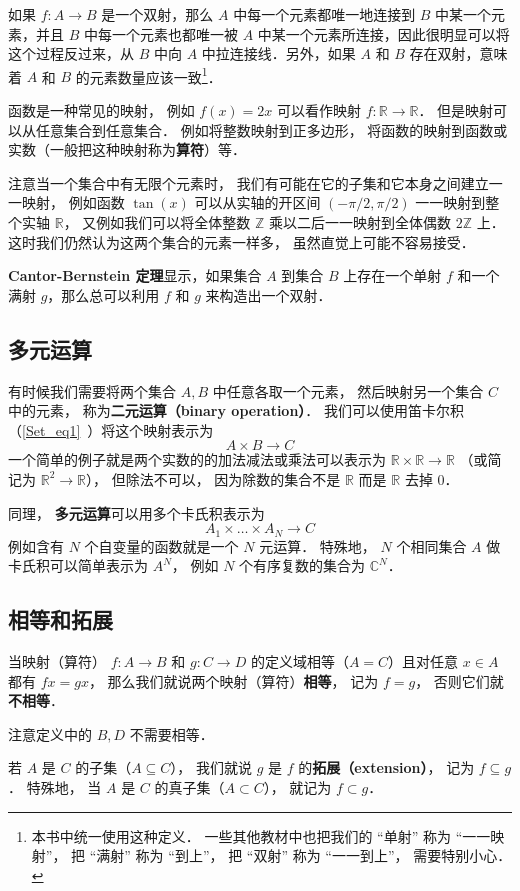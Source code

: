 如果 $f:A\to B$ 是一个双射，那么 $A$ 中每一个元素都唯一地连接到 $B$ 中某一个元素，并且 $B$ 中每一个元素也都唯一被 $A$ 中某一个元素所连接，因此很明显可以将这个过程反过来，从 $B$ 中向 $A$ 中拉连接线．另外，如果 $A$ 和 $B$ 存在双射，意味着 $A$ 和 $B$ 的元素数量应该一致\footnote{本书中统一使用这种定义． 一些其他教材中也把我们的 “单射” 称为 “一一映射”， 把 “满射” 称为 “到上”， 把 “双射” 称为 “一一到上”， 需要特别小心．}．

函数是一种常见的映射， 例如 $f(x) = 2x$ 可以看作映射 $f: \mathbb R \to \mathbb R$． 但是映射可以从任意集合到任意集合． 例如将整数映射到正多边形， 将函数的映射到函数或实数（一般把这种映射称为\textbf{算符}）等．

注意当一个集合中有无限个元素时， 我们有可能在它的子集和它本身之间建立一一映射， 例如函数 $\tan(x)$ 可以从实轴的开区间 $(-\pi/2, \pi/2)$ 一一映射到整个实轴 $\mathbb R$， 又例如我们可以将全体整数 $\mathbb Z$ 乘以二后一一映射到全体偶数 $2\mathbb Z$ 上． 这时我们仍然认为这两个集合的元素一样多， 虽然直觉上可能不容易接受．

\textbf{Cantor-Bernstein 定理}显示，如果集合 $A$ 到集合 $B$ 上存在一个单射 $f$ 和一个满射 $g$，那么总可以利用 $f$ 和 $g$ 来构造出一个双射．

\subsection{多元运算}\label{map_sub1}
有时候我们需要将两个集合 $A, B$ 中任意各取一个元素， 然后映射另一个集合 $C$ 中的元素， 称为\textbf{二元运算（binary operation）}． 我们可以使用笛卡尔积（\autoref{Set_eq1}~）将这个映射表示为
\begin{equation}\label{map_eq1}
A \times B \to C
\end{equation}
一个简单的例子就是两个实数的的加法减法或乘法可以表示为 $\mathbb R \times \mathbb R \to \mathbb R$ （或简记为 $\mathbb R^2 \to \mathbb R$）， 但除法不可以， 因为除数的集合不是 $\mathbb R$ 而是 $\mathbb R$ 去掉 $0$．

同理， \textbf{多元运算}可以用多个卡氏积表示为
\begin{equation}
A_1 \times \dots \times A_N \to C
\end{equation}
例如含有 $N$ 个自变量的函数就是一个 $N$ 元运算． 特殊地， $N$ 个相同集合 $A$ 做卡氏积可以简单表示为 $A^N$， 例如 $N$ 个有序复数的集合为 $\mathbb C^N$．

\subsection{相等和拓展}
\begin{definition}{}
当映射（算符） $f:A\to B$ 和 $g:C\to D$ 的定义域相等（$A = C$）且对任意 $x\in A$ 都有 $fx = gx$， 那么我们就说两个映射（算符）\textbf{相等}， 记为 $f = g$， 否则它们就\textbf{不相等}．
\end{definition}
注意定义中的 $B, D$ 不需要相等．
\begin{definition}{}
若 $A$ 是 $C$ 的子集（$A\subseteq C$）， 我们就说 $g$ 是 $f$ 的\textbf{拓展（extension）}， 记为 $f \subseteq g$． 特殊地， 当 $A$ 是 $C$ 的真子集（$A\subset C$）， 就记为 $f \subset g$．
\end{definition}

